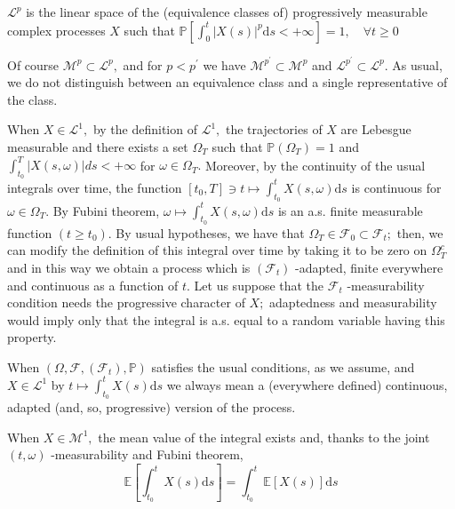 \begin{definition}

		$\mathcal{L}^{p}$ is the linear space of the (equivalence classes of) progressively measurable complex processes $X$ such that
		$
		\mathbb{P}\left[\int_{0}^{t}|X(s)|^{p} \mathrm{d} s<+\infty\right]=1, \quad \forall t \geq 0
		$

\end{definition}

	Of course $\mathcal{M}^{p} \subset \mathcal{L}^{p},$ and for $p<p^{\prime}$ we have $\mathcal{M}^{p^{\prime}} \subset \mathcal{M}^{p}$ and $\mathcal{L}^{p^{\prime}} \subset \mathcal{L}^{p} .$ As usual,
	we do not distinguish between an equivalence class and a single representative of the class.

	When $X \in \mathcal{L}^{1},$ by the definition of $\mathcal{L}^{1},$ the trajectories of $X$ are Lebesgue measurable and there exists a set $\Omega_{T}$ such that $\mathbb{P}\left(\Omega_{T}\right)=1$ and $\int_{t_{0}}^{T}|X(s, \omega)| d s<+\infty$ for $\omega \in \Omega_{T} .$ Moreover, by the continuity of the usual integrals over time, the function $\left[t_{0}, T\right] \ni t \mapsto \int_{t_{0}}^{t} X(s, \omega) \mathrm{d} s$ is continuous for $\omega \in \Omega_{T} .$ By Fubini theorem, $\omega \mapsto \int_{t_{0}}^{t} X(s, \omega) \mathrm{d} s$ is an a.s. finite measurable function $\left(t \geq t_{0}\right) .$ By usual hypotheses, we have that $\Omega_{T} \in \mathcal{F}_{0} \subset \mathcal{F}_{t} ;$ then, we can modify the definition of this integral over time by taking it to be zero on $\Omega_{T}^{c}$ and in this way we obtain a process which is $\left(\mathcal{F}_{t}\right)$ -adapted, finite everywhere and continuous as a function of $t .$ Let us suppose that the $\mathcal{F}_{t}$ -measurability condition needs the progressive character of $X ;$ adaptedness and measurability would imply only that the integral is a.s. equal to a random variable having this property.

	When $\left(\Omega, \mathcal{F},\left(\mathcal{F}_{t}\right), \mathbb{P}\right)$ satisfies the usual conditions, as we assume, and $X \in \mathcal{L}^{1}$ by $t \mapsto \int_{t_{0}}^{t} X(s) \mathrm{d} s$ we always mean a (everywhere defined) continuous, adapted (and, so, progressive) version of the process.

	When $X \in \mathcal{M}^{1},$ the mean value of the integral exists and, thanks to the joint
	$(t, \omega)$ -measurability and Fubini theorem,
	\[
	\mathbb{E}\left[\int_{t_{0}}^{t} X(s) \mathrm{d} s\right]=\int_{t_{0}}^{t} \mathbb{E}[X(s)] \mathrm{d} s
	\]


